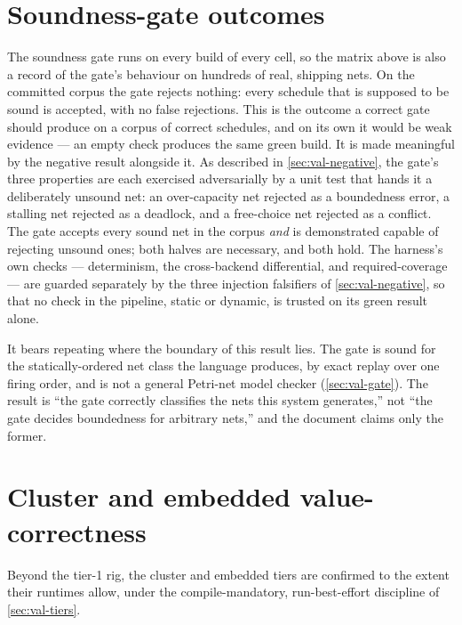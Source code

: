 

\section{Soundness-gate outcomes}\label{sec:res-soundness}

The soundness gate runs on every build of every cell, so the matrix above is also a
record of the gate's behaviour on hundreds of real, shipping nets. On the committed
corpus the gate rejects nothing: every schedule that is supposed to be sound is
accepted, with no false rejections. This is the outcome a correct gate should
produce on a corpus of correct schedules, and on its own it would be weak evidence
--- an empty check produces the same green build. It is made meaningful by the
negative result alongside it. As described in \cref{sec:val-negative}, the gate's
three properties are each exercised adversarially by a unit test that hands it a
deliberately unsound net: an over-capacity net rejected as a boundedness error, a
stalling net rejected as a deadlock, and a free-choice net rejected as a conflict.
The gate accepts every sound net in the corpus \emph{and} is demonstrated capable
of rejecting unsound ones; both halves are necessary, and both hold. The harness's
own checks --- determinism, the cross-backend differential, and required-coverage
--- are guarded separately by the three injection falsifiers of
\cref{sec:val-negative}, so that no check in the pipeline, static or dynamic, is
trusted on its green result alone.

It bears repeating where the boundary of this result lies. The gate is sound for the
statically-ordered net class the language produces, by exact replay over one firing
order, and is not a general Petri-net model checker (\cref{sec:val-gate}). The
result is ``the gate correctly classifies the nets this system generates,'' not
``the gate decides boundedness for arbitrary nets,'' and the document claims
only the former.

\section{Cluster and embedded value-correctness}\label{sec:res-tiers}

Beyond the tier-1 rig, the cluster and embedded tiers are confirmed to the extent
their runtimes allow, under the compile-mandatory, run-best-effort discipline of
\cref{sec:val-tiers}.

